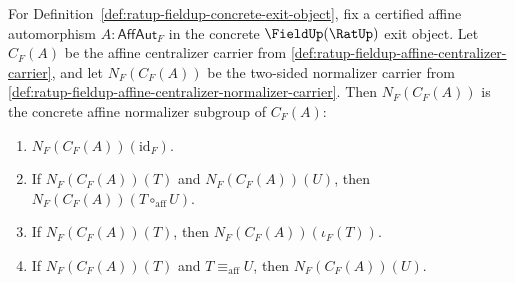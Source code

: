 \begin{theorem}
\label{thm:ratup-fieldup-affine-centralizer-normalizer-subgroup}
For Definition~\ref{def:ratup-fieldup-concrete-exit-object}, fix a certified
affine automorphism $A:\mathsf{AffAut}_F$ in the concrete $\FieldUp(\RatUp)$
exit object. Let $C_F(A)$ be the affine centralizer carrier from
\autoref{def:ratup-fieldup-affine-centralizer-carrier}, and let $N_F(C_F(A))$
be the two-sided normalizer carrier from
\autoref{def:ratup-fieldup-affine-centralizer-normalizer-carrier}. Then
$N_F(C_F(A))$ is the concrete affine normalizer subgroup of $C_F(A)$:
\begin{enumerate}
\item $N_F(C_F(A))(\mathrm{id}_F)$.
\item If $N_F(C_F(A))(T)$ and $N_F(C_F(A))(U)$, then
$N_F(C_F(A))(T\circ_{\mathrm{aff}}U)$.
\item If $N_F(C_F(A))(T)$, then $N_F(C_F(A))(\iota_F(T))$.
\item If $N_F(C_F(A))(T)$ and $T\equiv_{\mathrm{aff}}U$, then
$N_F(C_F(A))(U)$.
\end{enumerate}
\end{theorem}
